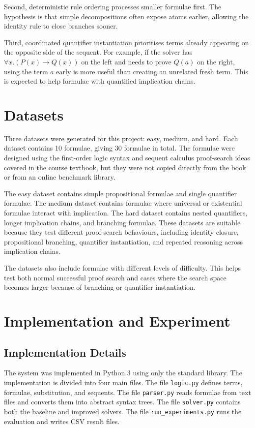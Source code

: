 \documentclass[runningheads]{llncs}
\begin{document}
Second, deterministic rule ordering processes smaller formulae first. The hypothesis is that simple decompositions often expose atoms earlier, allowing the identity rule to close branches sooner.

Third, coordinated quantifier instantiation prioritises terms already appearing on the opposite side of the sequent. For example, if the solver has $\forall x.(P(x) \rightarrow Q(x))$ on the left and needs to prove $Q(a)$ on the right, using the term $a$ early is more useful than creating an unrelated fresh term. This is expected to help formulae with quantified implication chains.

\section{Datasets}

Three datasets were generated for this project: easy, medium, and hard. Each dataset contains 10 formulae, giving 30 formulae in total. The formulae were designed using the first-order logic syntax and sequent calculus proof-search ideas covered in the course textbook, but they were not copied directly from the book or from an online benchmark library.

The easy dataset contains simple propositional formulae and single quantifier formulae. The medium dataset contains formulae where universal or existential formulae interact with implication. The hard dataset contains nested quantifiers, longer implication chains, and branching formulae. These datasets are suitable because they test different proof-search behaviours, including identity closure, propositional branching, quantifier instantiation, and repeated reasoning across implication chains.

The datasets also include formulae with different levels of difficulty. This helps test both normal successful proof search and cases where the search space becomes larger because of branching or quantifier instantiation.

\section{Implementation and Experiment}

\subsection{Implementation Details}

The system was implemented in Python 3 using only the standard library. The implementation is divided into four main files. The file \texttt{logic.py} defines terms, formulae, substitution, and sequents. The file \texttt{parser.py} reads formulae from text files and converts them into abstract syntax trees. The file \texttt{solver.py} contains both the baseline and improved solvers. The file \texttt{run\_experiments.py} runs the evaluation and writes CSV result files.
\end{document}

